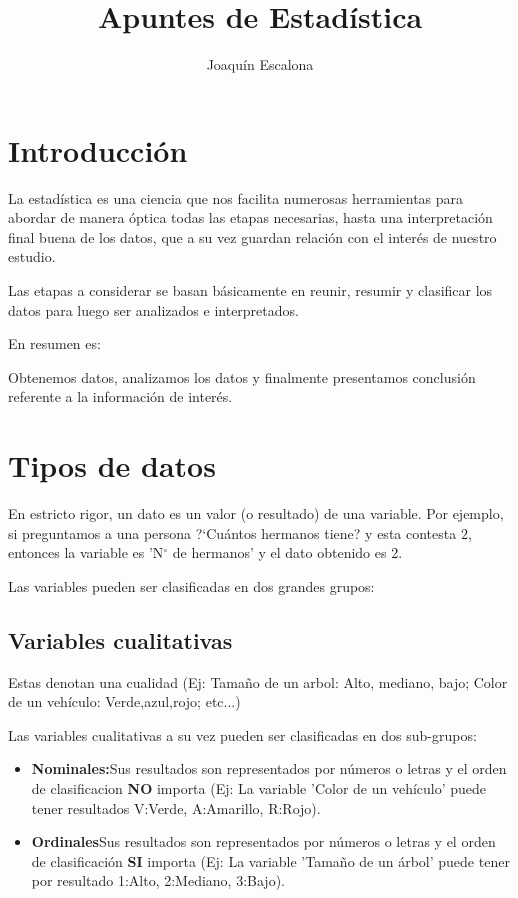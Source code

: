 \documentclass[12pt,twocolumn,a4paper]{report}
\title{Apuntes de Estadística}
\author{Joaquín Escalona}
\date{}
\begin{document}
\maketitle

\newpage
\tableofcontents

\onecolumn

\chapter*{Introducción}
La estadística es una ciencia que nos facilita numerosas herramientas para abordar de manera óptica todas las etapas necesarias, hasta una interpretación final buena de los datos, que a su vez guardan relación con el interés de nuestro estudio.

Las etapas a considerar se basan básicamente en reunir, resumir y clasificar los datos para luego ser analizados e interpretados.

En resumen es:

Obtenemos datos, analizamos los datos y finalmente presentamos conclusión referente a la información de interés.

\twocolumn

\chapter*{Tipos de datos}
En estricto rigor, un dato es un valor (o resultado) de una variable. Por ejemplo, si preguntamos a una persona ?`Cuántos hermanos tiene? y esta contesta $2$, entonces la variable es 'N$^{\circ}$ de hermanos' y el dato obtenido es 2. 

Las variables pueden ser clasificadas en dos grandes grupos:
\section*{Variables cualitativas}
Estas denotan una cualidad (Ej: Tamaño de un arbol: Alto, mediano, bajo; Color de un vehículo: Verde,azul,rojo; etc...)

Las variables cualitativas a su vez pueden ser clasificadas en
dos sub-grupos:
\begin{itemize}
\setlength\itemsep{0.001cm}
\item{\textbf{Nominales:}Sus resultados son representados por números o letras y el orden de clasificacion \textbf{NO} importa (Ej: La variable 'Color de un vehículo' puede tener resultados V:Verde, A:Amarillo, R:Rojo).}
\item{\textbf{Ordinales}Sus resultados son representados por números o letras y el orden de clasificación \textbf{SI} importa (Ej: La variable 'Tamaño de un árbol' puede tener por resultado 1:Alto, 2:Mediano, 3:Bajo).}
\end{itemize}
\end{document}

